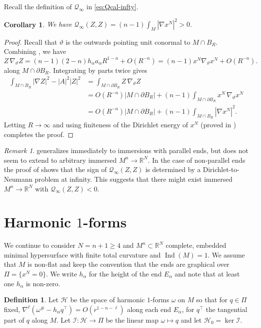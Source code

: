 \documentclass[11pt]{amsart}
\numberwithin{equation}{section}
\theoremstyle{plain}
\newtheorem{corollary}[corollary]{Corollary}
\theoremstyle{definition}
\newtheorem{definition}[definition]{Definition}
\theoremstyle{remark}
\newtheorem{remark}[remark]{Remark}
\newcommand{\R}{\mathbb{R}}
\DeclareMathOperator{\Ind}{Ind}
\newcommand{\Hcal}{\mathcal H}
\newcommand{\Hzero}{\mathcal H_0}
\newcommand{\Ical}{\mathcal I}
\newcommand{\Qcal}{\mathcal Q}
\begin{document}
Recall the definition of $\Qcal_\infty$ in \eqref{eq:Qcal-infty}. 
\begin{corollary}\label{cor:QinfZ}
We have $\Qcal_\infty(Z,Z) = (n-1)\int_M |\nabla x^N|^2 > 0$. 
\end{corollary}
\begin{proof}
Recall that $\vartheta$ is the outwards pointing unit conormal to $M\cap B_R$. Combining , we have
\[
Z \, \nabla_\vartheta Z  = (n-1) (2-n)h_\alpha a_\alpha R^{1-n} + O(R^{-n}) = (n-1) x^N \nabla_\vartheta x^N + O(R^{-n}). 
\]
along $M \cap \partial B_R$. Integrating by parts twice gives
\begin{align*}
\int_{M\cap B_R} |\nabla Z|^2 - |A|^2 |Z|^2 & = \int_{M \cap \partial B_R} Z\,  \nabla_\vartheta Z \\
& = O(R^{-n}) |M\cap \partial B_R| +  (n-1) \int_{M\cap \partial B_R} x^N\, \nabla_\vartheta x^N\\
& = O(R^{-n}) |M\cap \partial B_R| +  (n-1) \int_{M\cap B_R} |\nabla x^N|^2. 
\end{align*}
Letting $R\to\infty$ and using finiteness of the Dirichlet energy of $x^N$ (proved in ) completes the proof. 
\end{proof}

\begin{remark}
 generalizes immediately to immersions with parallel ends, but does not seem to extend to arbitrary immersed $M^n\to\R^N$. In the case of non-parallel ends the proof of  shows that the sign of $\Qcal_\infty(Z,Z)$ is determined by a Dirichlet-to-Neumann problem at infinity. This suggests that there might exist immersed $M^n\to\R^N$ with $\Qcal_\infty(Z,Z) < 0$. 
\end{remark}

\section{Harmonic $1$-forms} \label{sec:harmonic-1-forms}
We continue to consider $N = n+1\geq 4$ and $M^n\subset \R^N$ complete, embedded minimal hypersurface with finite total curvature and $\Ind(M) = 1$. We assume that $M$ is non-flat and keep the convention that the ends are graphical over $\Pi = \{x^N = 0\}$. We write $h_\alpha$ for the height of the end $E_\alpha$ and note that at least one $h_\alpha$ is non-zero. 

\begin{definition}\label{defi:Hcal}
Let $\Hcal$ be the space of harmonic $1$-forms $\omega$ on $M$ so that for $q \in \Pi$ fixed, $\nabla^\ell(\omega^\# - h_\alpha q^\top) = O(r^{1-n-\ell})$ along each end $E_\alpha$, for $q^\top$ the tangential part of $q$ along $M$. Let $\Ical : \Hcal \to \Pi$ be the linear map $\omega\mapsto q$ and let $\Hzero = \ker \Ical$. 
\end{definition}
\end{document}

